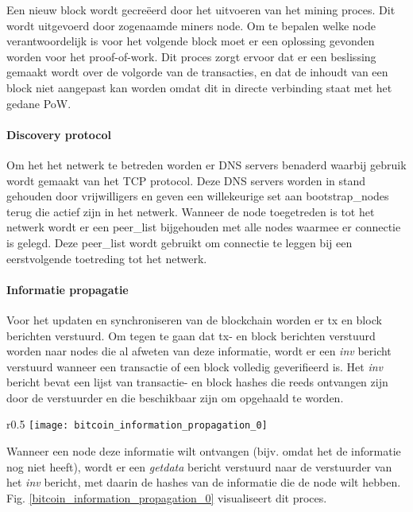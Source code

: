 \clearpage
Een nieuw block wordt gecreëerd door het uitvoeren van het mining proces. Dit wordt uitgevoerd door zogenaamde \glspl{miner} node. Om te bepalen welke \gls{node} verantwoordelijk is voor het volgende block moet er een oplossing gevonden worden voor het proof-of-work. Dit proces zorgt ervoor dat er een beslissing gemaakt wordt over de volgorde van de transacties, en dat de inhoudt van een block niet aangepast kan worden omdat dit in directe verbinding staat met het gedane \acrshort{PoW}.

\paragraph{Discovery protocol}

Om het het netwerk te betreden worden er DNS servers benaderd waarbij gebruik wordt gemaakt van het TCP protocol. Deze DNS servers worden in stand gehouden door vrijwilligers en geven een willekeurige set aan \glspl{bootstrap_node} terug die actief zijn in het netwerk. Wanneer de \gls{node} toegetreden is tot het netwerk wordt er een \gls{peer_list} bijgehouden met alle \glspl{node} waarmee er connectie is gelegd. Deze \gls{peer_list} wordt gebruikt om connectie te leggen bij een eerstvolgende toetreding tot het netwerk.

\paragraph{Informatie propagatie}

Voor het updaten en synchroniseren van de blockchain worden er \acrfull{tx} en block berichten verstuurd. Om tegen te gaan dat \acrshort{tx}- en block berichten verstuurd worden naar \glspl{node} die al afweten van deze informatie, wordt er een \textit{inv} bericht verstuurd wanneer een transactie of een block volledig geverifieerd is. Het \textit{inv} bericht bevat een lijst van transactie- en block hashes die reeds ontvangen zijn door de verstuurder en die beschikbaar zijn om opgehaald te worden. 
\begin{wrapfigure}{r}{0.5\textwidth}
  \texttt{[image: bitcoin\_information\_propagation\_0]}
  \caption{Berichten die verzonden worden om informatie over een block uit te wisselen \citep[p.~4]{6688704}.}
  \label{bitcoin_information_propagation_0}
\end{wrapfigure}

Wanneer een \gls{node} deze informatie wilt ontvangen (bijv. omdat het de informatie nog niet heeft), wordt er een \textit{getdata} bericht verstuurd naar de verstuurder van het \textit{inv} bericht, met daarin de hashes van de informatie die de \gls{node} wilt hebben. Fig. \ref{bitcoin_information_propagation_0} visualiseert dit proces.